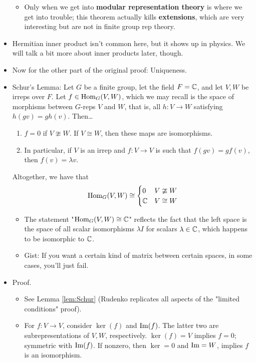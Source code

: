 \documentclass[../notes.tex]{subfiles}
\begin{document}
\begin{itemize}
    \begin{itemize}
        \item Only when we get into \textbf{modular representation theory} is where we get into trouble; this theorem actually kills \textbf{extensions}, which are very interesting but are not in finite group rep theory.
    \end{itemize}
    \item Hermitian inner product isn't common here, but it shows up in physics. We will talk a bit more about inner products later, though.
    \item Now for the other part of the original proof: Uniqueness.
    \item Schur's Lemma: Let $G$ be a finite group, let the field $F=\mathbb{C}$, and let $V,W$ be irreps over $F$. Let $f\in\operatorname{Hom}_G(V,W)$, which we may recall is the space of morphisms between $G$-reps $V$ and $W$, that is, all $h:V\to W$ satisfying $h(gv)=gh(v)$. Then\dots
    \begin{enumerate}
        \item $f=0$ if $V\ncong W$. If $V\cong W$, then these maps are isomorphisms.
        \item In particular, if $V$ is an irrep and $f:V\to V$ is such that $f(gv)=gf(v)$, then $f(v)=\lambda v$.
    \end{enumerate}
    Altogether, we have that
    \begin{equation*}
        \operatorname{Hom}_G(V,W) \cong
        \begin{cases}
            0 & V\ncong W\\
            \mathbb{C} & V\cong W
        \end{cases}
    \end{equation*}
    \begin{itemize}
        \item The statement "$\operatorname{Hom}_G(V,W)\cong\mathbb{C}$" reflects the fact that the left space is the space of all scalar isomorphisms $\lambda I$ for scalars $\lambda\in\mathbb{C}$, which happens to be isomorphic to $\mathbb{C}$.
        \item Gist: If you want a certain kind of matrix between certain spaces, in some cases, you'll just fail.
    \end{itemize}
    \item Proof.
    \begin{itemize}
        \item See Lemma \ref{lem:Schur} (Rudenko replicates all aspects of the "limited conditions" proof).
        \item For $f:V\to V$, consider $\ker(f)$ and $\operatorname{Im}(f)$. The latter two are subrepresentations of $V,W$, respectively. $\ker(f)=V$ implies $f=0$; symmetric with $\operatorname{Im}(f)$. If nonzero, then $\ker=0$ and $\operatorname{Im}=W$, implies $f$ is an isomorphism.

\end{itemize}
\end{itemize}
\end{document}
